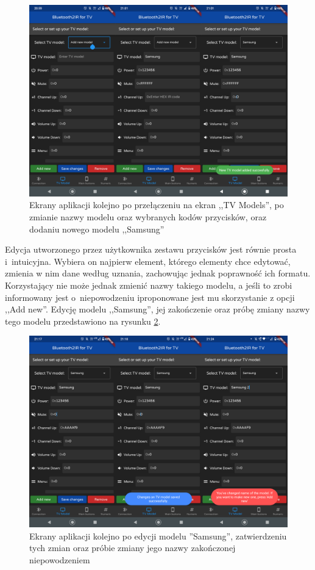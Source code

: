 \documentclass[12pt,twoside]{article}
\begin{document}
\begin{figure}[ht]
   \centering
   \includegraphics[width=15cm]{images/addingSamsung.png}
   \caption{Ekrany aplikacji kolejno po przełączeniu na ekran ,,TV Models'', po zmianie nazwy modelu oraz wybranych kodów przycisków, oraz dodaniu nowego modelu ,,Samsung''}
   \label{Fig:addingSamsung}
\end{figure}

Edycja utworzonego przez użytkownika zestawu przycisków jest równie prosta i~intuicyjna. Wybiera on najpierw element, którego elementy chce edytować, zmienia w nim dane według uznania, zachowując jednak poprawność ich formatu. Korzystający nie może jednak zmienić nazwy takiego modelu, a jeśli to zrobi informowany jest o~niepowodzeniu iproponowane jest mu skorzystanie z opcji ,,Add new''. Edycję modelu ,,Samsung'', jej zakończenie oraz  próbę zmiany nazwy tego modelu przedstawiono na rysunku \ref*{Fig:changingSamsung}.

\begin{figure}[ht]
   \centering
   \includegraphics[width=15cm]{images/changingSamsung.png}
   \caption{Ekrany aplikacji kolejno po edycji modelu ''Samsung'', zatwierdzeniu tych zmian oraz próbie zmiany jego nazwy zakończonej niepowodzeniem}
   \label{Fig:changingSamsung}
\end{figure}
\end{document}

